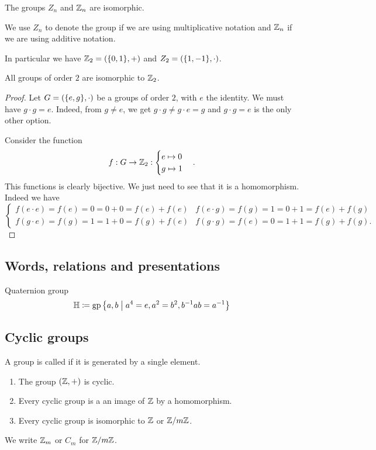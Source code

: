 \begin{proposition}
The groups $Z_n$ and $\mathbb{Z}_n$ are isomorphic.
\end{proposition}
We use $Z_n$ to denote the group if we are using multiplicative notation and $\mathbb{Z}_n$ if we are using additive notation.

In particular we have $\Z_2 = \sSet{\{0,1\},+}$ and $Z_2 = \sSet{\{1,-1\},\cdot}$.

\begin{lemma}
All groups of order $2$ are isomorphic to $\mathbb{Z}_2$.
\end{lemma}
\begin{proof}
Let $G = \sSet{\{e,g\}, \cdot}$ be a groups of order $2$, with $e$ the identity.
We must have $g\cdot g = e$. Indeed, from $g \neq e$, we get $g\cdot g \neq g\cdot e = g$ and $g\cdot g = e$ is the only other option.

Consider the function
\[ f: G \to \mathbb{Z}_2: \begin{cases}
e\mapsto 0 \\ g \mapsto 1
\end{cases}. \]
This functions is clearly bijective. We just need to see that it is a homomorphism. Indeed we have
\[ \begin{cases}
f(e\cdot e) = f(e) = 0 = 0+0 = f(e) + f(e) & f(e\cdot g) = f(g) = 1 = 0+1 = f(e) + f(g) \\
f(g\cdot e) = f(g) = 1 = 1+0 = f(g) + f(e) & f(g\cdot g) = f(e) = 0 = 1+1 = f(g) + f(g). 
\end{cases} \] 
\end{proof}

\subsection{Words, relations and presentations}
\begin{example}
Quaternion group
\[ \mathbb{H} \defeq \group\setbuilder{a,b}{a^4=e, a^2=b^2, b^{-1}ab = a^{-1}} \]
\end{example}

\subsection{Cyclic groups}
\begin{definition}
A group is called  if it is generated by a single element.
\end{definition}
\begin{lemma}
\begin{enumerate}
\item The group $(\mathbb{Z}, +)$ is cyclic.
\item Every cyclic group is a an image of $\mathbb{Z}$ by a homomorphism.
\item Every cyclic group is isomorphic to $\mathbb{Z}$ or $\mathbb{Z}/m\mathbb{Z}$.
\end{enumerate}
\end{lemma}
We write $\mathbb{Z}_m$ or $C_m$ for $\mathbb{Z}/m\mathbb{Z}$.
 
